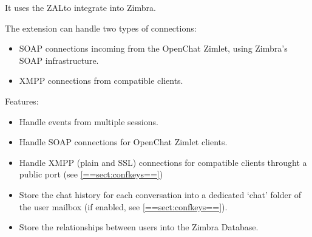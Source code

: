     It uses the ZAL\footnotemark[1] to integrate into Zimbra.

    The extension can handle two types of connections:
    \begin{itemize}
        \item SOAP connections incoming from the OpenChat Zimlet, using Zimbra's SOAP infrastructure.
        \item XMPP connections from compatible clients.
    \end{itemize}

    Features:
    \begin{itemize}
        \item Handle events from multiple sessions.
        \item Handle SOAP connections for OpenChat Zimlet clients.
        \item Handle XMPP (plain and SSL) connections for compatible clients throught a public port (see \ref{==sect:confkeys==})
        \item Store the chat history for each conversation into a dedicated `chat' folder of the user mailbox (if enabled, see \ref{==sect:confkeys==}).
        \item Store the relationships between users into the Zimbra Database.
    \end{itemize}

